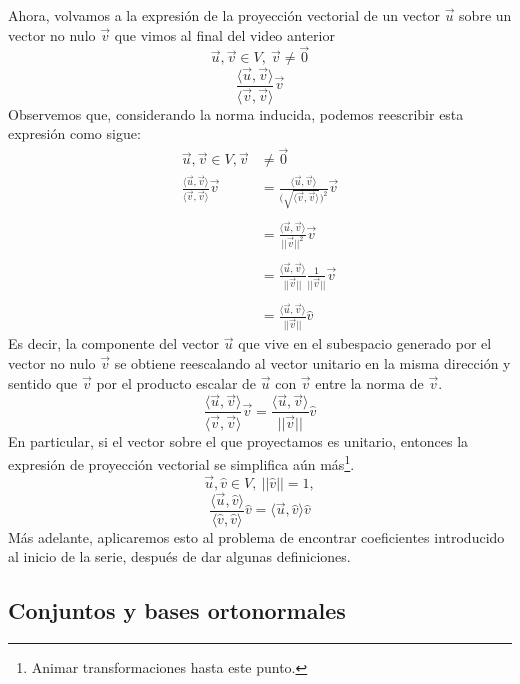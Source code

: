 \documentclass[12pt,dvipsnames]{article}
\numberwithin{equation}{section}
\begin{document}
Ahora, volvamos a la expresión de la proyección vectorial de un vector $\vec{u}$ sobre un vector no nulo $\vec{v}$ que vimos al final del video anterior
\[
\vec{u},\vec{v}\in V, \ \vec{v}\neq \vec{0}
\] 
\[
\frac{\langle \vec{u} , \vec{v} \rangle}{\langle \vec{v} , \vec{v} \rangle} \vec{v} 
\] 
Observemos que, considerando la norma inducida, podemos reescribir esta expresión como sigue:
\begin{align*}
    \vec{u},\vec{v}\in V, \vec{v}&\neq \vec{0} \\
    \frac{\langle \vec{u} , \vec{v} \rangle}{\langle \vec{v} , \vec{v} \rangle} \vec{v} &= \frac{\langle \vec{u} , \vec{v} \rangle}{\big(\sqrt{\langle \vec{v} , \vec{v} \rangle}\big)^2} \vec{v} \\ \\
                                                                                        &= \frac{\langle \vec{u} , \vec{v} \rangle}{||\vec{v}||^2} \vec{v} \\ \\
                                                                                        &= \frac{\langle \vec{u} , \vec{v} \rangle}{||\vec{v}||} \frac{1}{||\vec{v}||} \vec{v} \\ \\
                                                                                        &= \frac{\langle \vec{u} , \vec{v} \rangle}{||\vec{v}||} \hat{v}
\end{align*}
Es decir, la componente del vector $\vec{u}$ que vive en el subespacio generado por el vector no nulo $\vec{v}$ se obtiene reescalando al vector unitario en la misma dirección y sentido que $\vec{v}$ por el producto escalar de $\vec{u}$ con $\vec{v}$ entre la norma de $\vec{v}$.
\[
    \frac{\langle \vec{u} , \vec{v} \rangle}{\langle \vec{v} , \vec{v} \rangle} \vec{v} = \frac{\langle \vec{u} , \vec{v} \rangle}{||\vec{v}||} \hat{v}
\] 
En particular, si el vector sobre el que proyectamos es unitario, entonces la expresión de proyección vectorial se simplifica aún más\footnote{Animar transformaciones hasta este punto.}.
\[
\vec{u},\hat{v}\in V, \ ||\hat{v}||=1,
\] 
\[
    \frac{\langle \vec{u} , \hat{v} \rangle}{\langle \hat{v} , \hat{v} \rangle} \hat{v} = \langle \vec{u} , \hat{v} \rangle \hat{v}
\] 
Más adelante, aplicaremos esto al problema de encontrar coeficientes introducido al inicio de la serie, después de dar algunas definiciones.

\subsection{Conjuntos y bases ortonormales}
\end{document}
